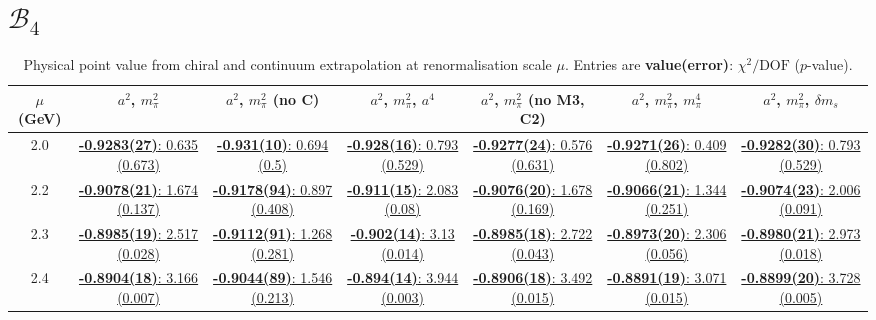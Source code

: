 \documentclass[12pt]{extarticle}
\begin{document}
\section{$\mathcal{B}_4$}
\begin{table}[h!]
\begin{center}
\begin{tabular}{|c|c|c|c|c|c|c|}
\hline
$\mu$ (GeV) & $a^2$, $m_\pi^2$& $a^2$, $m_\pi^2$ (no C)& $a^2$, $m_\pi^2$, $a^4$& $a^2$, $m_\pi^2$ (no M3, C2)& $a^2$, $m_\pi^2$, $m_\pi^4$& $a^2$, $m_\pi^2$, $\delta m_s$\\
\hline
2.0& \hyperlink{SSpPP/NPR/bag_a2m2_20.pdf.1}{\textbf{-0.9283(27)}: 0.635 (0.673)} & \hyperlink{SSpPP/NPR/bag_a2m2noC_20.pdf.1}{\textbf{-0.931(10)}: 0.694 (0.5)} & \hyperlink{SSpPP/NPR/bag_a2a4m2_20.pdf.1}{\textbf{-0.928(16)}: 0.793 (0.529)} & \hyperlink{SSpPP/NPR/bag_a2m2mcut_20.pdf.1}{\textbf{-0.9277(24)}: 0.576 (0.631)} & \hyperlink{SSpPP/NPR/bag_a2m2m4_20.pdf.1}{\textbf{-0.9271(26)}: 0.409 (0.802)} & \hyperlink{SSpPP/NPR/bag_a2m2delm_20.pdf.1}{\textbf{-0.9282(30)}: 0.793 (0.529)}\\
2.2& \hyperlink{SSpPP/NPR/bag_a2m2_22.pdf.1}{\textbf{-0.9078(21)}: 1.674 (0.137)} & \hyperlink{SSpPP/NPR/bag_a2m2noC_22.pdf.1}{\textbf{-0.9178(94)}: 0.897 (0.408)} & \hyperlink{SSpPP/NPR/bag_a2a4m2_22.pdf.1}{\textbf{-0.911(15)}: 2.083 (0.08)} & \hyperlink{SSpPP/NPR/bag_a2m2mcut_22.pdf.1}{\textbf{-0.9076(20)}: 1.678 (0.169)} & \hyperlink{SSpPP/NPR/bag_a2m2m4_22.pdf.1}{\textbf{-0.9066(21)}: 1.344 (0.251)} & \hyperlink{SSpPP/NPR/bag_a2m2delm_22.pdf.1}{\textbf{-0.9074(23)}: 2.006 (0.091)}\\
2.3& \hyperlink{SSpPP/NPR/bag_a2m2_23.pdf.1}{\textbf{-0.8985(19)}: 2.517 (0.028)} & \hyperlink{SSpPP/NPR/bag_a2m2noC_23.pdf.1}{\textbf{-0.9112(91)}: 1.268 (0.281)} & \hyperlink{SSpPP/NPR/bag_a2a4m2_23.pdf.1}{\textbf{-0.902(14)}: 3.13 (0.014)} & \hyperlink{SSpPP/NPR/bag_a2m2mcut_23.pdf.1}{\textbf{-0.8985(18)}: 2.722 (0.043)} & \hyperlink{SSpPP/NPR/bag_a2m2m4_23.pdf.1}{\textbf{-0.8973(20)}: 2.306 (0.056)} & \hyperlink{SSpPP/NPR/bag_a2m2delm_23.pdf.1}{\textbf{-0.8980(21)}: 2.973 (0.018)}\\
2.4& \hyperlink{SSpPP/NPR/bag_a2m2_24.pdf.1}{\textbf{-0.8904(18)}: 3.166 (0.007)} & \hyperlink{SSpPP/NPR/bag_a2m2noC_24.pdf.1}{\textbf{-0.9044(89)}: 1.546 (0.213)} & \hyperlink{SSpPP/NPR/bag_a2a4m2_24.pdf.1}{\textbf{-0.894(14)}: 3.944 (0.003)} & \hyperlink{SSpPP/NPR/bag_a2m2mcut_24.pdf.1}{\textbf{-0.8906(18)}: 3.492 (0.015)} & \hyperlink{SSpPP/NPR/bag_a2m2m4_24.pdf.1}{\textbf{-0.8891(19)}: 3.071 (0.015)} & \hyperlink{SSpPP/NPR/bag_a2m2delm_24.pdf.1}{\textbf{-0.8899(20)}: 3.728 (0.005)}\\
\hline
\end{tabular}
\caption{Physical point value from chiral and continuum extrapolation at renormalisation scale $\mu$. Entries are \textbf{value(error)}: $\chi^2/\text{DOF}$ ($p$-value).}
\end{center}
\end{table}
\end{document}

